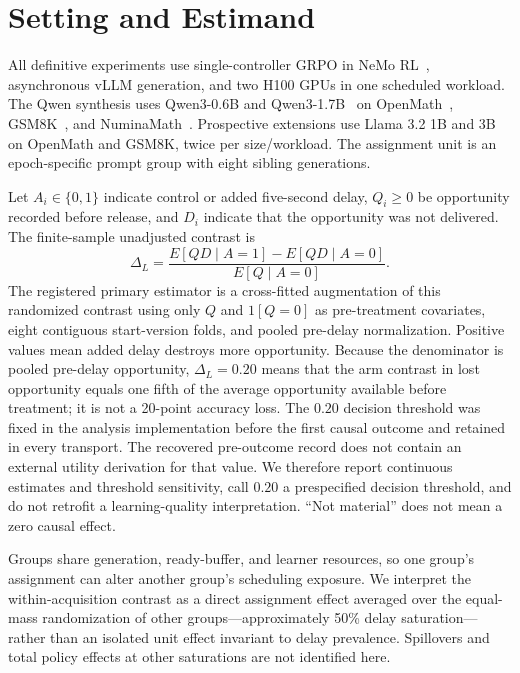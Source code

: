 \documentclass{article}
\begin{document}
\section{Setting and Estimand}
All definitive experiments use single-controller GRPO in NeMo RL~\cite{nvidia2025nemorl}, asynchronous vLLM generation, and two H100 GPUs in one scheduled workload. The Qwen synthesis uses Qwen3-0.6B and Qwen3-1.7B~\cite{qwen2025qwen3} on OpenMath~\cite{toshniwal2024openmath}, GSM8K~\cite{cobbe2021gsm8k}, and NuminaMath~\cite{numinamath2024dataset}. Prospective extensions use Llama 3.2 1B and 3B on OpenMath and GSM8K, twice per size/workload. The assignment unit is an epoch-specific prompt group with eight sibling generations.

Let $A_i\in\{0,1\}$ indicate control or added five-second delay, $Q_i\ge0$ be opportunity recorded before release, and $D_i$ indicate that the opportunity was not delivered. The finite-sample unadjusted contrast is
\begin{equation}
\Delta_L=\frac{E[Q D\mid A=1]-E[Q D\mid A=0]}{E[Q\mid A=0]}.
\end{equation}
The registered primary estimator is a cross-fitted augmentation of this randomized contrast using only $Q$ and $1[Q=0]$ as pre-treatment covariates, eight contiguous start-version folds, and pooled pre-delay normalization. Positive values mean added delay destroys more opportunity. Because the denominator is pooled pre-delay opportunity, $\Delta_L=0.20$ means that the arm contrast in lost opportunity equals one fifth of the average opportunity available before treatment; it is not a 20-point accuracy loss. The $0.20$ decision threshold was fixed in the analysis implementation before the first causal outcome and retained in every transport. The recovered pre-outcome record does not contain an external utility derivation for that value. We therefore report continuous estimates and threshold sensitivity, call $0.20$ a prespecified decision threshold, and do not retrofit a learning-quality interpretation. ``Not material'' does not mean a zero causal effect.

Groups share generation, ready-buffer, and learner resources, so one group's assignment can alter another group's scheduling exposure. We interpret the within-acquisition contrast as a direct assignment effect averaged over the equal-mass randomization of other groups---approximately 50\% delay saturation---rather than an isolated unit effect invariant to delay prevalence. Spillovers and total policy effects at other saturations are not identified here.
\end{document}
